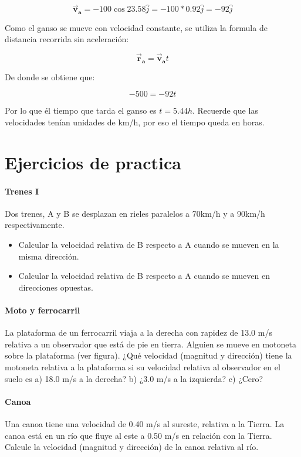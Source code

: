 \documentclass[a4paper,11pt]{article}
\theoremstyle{mytheor}
\begin{document}
\begin{equation}
\vec{\textbf{v}}_{\textbf{a}} = -100 \cos 23.58 \hat{j} = -100 * 0.92 \hat{j} = -92 \hat{j}
\end{equation}


Como el ganso se mueve con velocidad constante, se utiliza la formula de distancia recorrida sin aceleración:

\begin{equation}
\vec{\textbf{r}}_{\textbf{a}} =  \vec{\textbf{v}}_{\textbf{a}} t
\end{equation}

De donde se obtiene que:

$$ -500 = -92 t$$

Por lo que él tiempo que tarda el ganso es $t=5.44 h$. Recuerde que las velocidades tenían unidades de km/h, por eso el tiempo queda en horas.


 \section{Ejercicios de practica}


\paragraph{Trenes I} Dos trenes, A y B se desplazan en rieles paralelos a 70km/h y a 90km/h respectivamente. 


\begin{itemize}
	\item Calcular la velocidad relativa de B respecto a A cuando se mueven en la misma dirección.
	\item Calcular la velocidad relativa de B respecto a A cuando se mueven en direcciones opuestas.
\end{itemize}

\paragraph{Moto y ferrocarril}
La plataforma de un ferrocarril viaja a la derecha con rapidez
de 13.0 m/s relativa a un observador que está de pie en tierra. Alguien
se mueve en motoneta sobre la plataforma (ver figura). ¿Qué velocidad (magnitud y dirección) tiene la motoneta relativa a la plataforma
si su velocidad relativa al observador en el suelo es a) 18.0 m/s a la
derecha? b) ¿3.0 m/s a la izquierda? c) ¿Cero?


\paragraph{Canoa}
Una canoa tiene una velocidad de 0.40 m/s al sureste, relativa
a la Tierra. La canoa está en un río que fluye al este a 0.50 m/s en
relación con la Tierra. Calcule la velocidad (magnitud y dirección) de
la canoa relativa al río.
\end{document}
